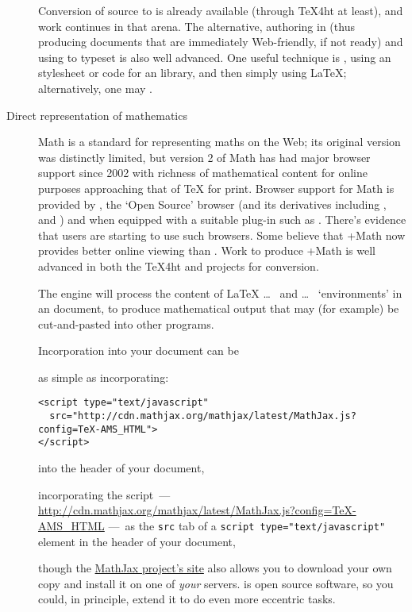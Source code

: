 \begin{description}
  Conversion of \AllTeX{} source to  is already available
  (through \TeX{}4ht at least), and work continues in that arena.  The
  alternative, authoring in  (thus producing documents that
  are immediately Web-friendly, if not ready) and using \AllTeX{} to
  typeset is also well advanced.  One useful technique is
  ,
  using an  stylesheet or code for an  library,
  and then simply using \LaTeX{}; alternatively, one may
  .
\item[Direct representation of mathematics]
  Math is a standard for representing maths on the Web; its
  original version was distinctly limited, but version 2 of Math
  has had major browser support since 2002 with richness of mathematical
  content for online purposes approaching that of \TeX{} for print.
  Browser support for Math is provided by , the
  `Open Source' browser  (and its derivatives
  including ,  and ) and
   when equipped with a suitable plug-in
  such as .
  There's evidence that \AllTeX{} users are starting to use such
  browsers.  Some believe that +Math now provides
  better online viewing than .
  Work to produce +Math is well advanced in both the
  \TeX{}4ht and  projects for \AllTeX{} conversion.

  The \href{http://www.mathjax.org}{} engine will process the
  content of \LaTeX{} \csx{[} \dots{}~\csx{]} and \csx{(} \dots{}~\csx{)}
  `environments' in an  document, to produce mathematical
  output that may (for example) be cut-and-pasted into other programs.

  Incorporation into your document can be
\begin{wideversion}
  as simple as incorporating:
\begin{verbatim}
<script type="text/javascript"
  src="http://cdn.mathjax.org/mathjax/latest/MathJax.js?config=TeX-AMS_HTML">
</script>
\end{verbatim}
  into the header of your  document,
\end{wideversion}
\begin{narrowversion}
  incorporating the script~---
  \url{http://cdn.mathjax.org/mathjax/latest/MathJax.js?config=TeX-AMS_HTML}
  ---~as the \texttt{src} tab of a \texttt{script type="text/javascript"}
  element in the header of your  document,
\end{narrowversion}
  though the \href{http://www.mathjax.org/}{MathJax project's site}
  also allows you to download your own copy and install it on one of
  \emph{your} servers.   is open source software, so
  you could, in principle, extend it to do even more eccentric tasks.


\end{description}
